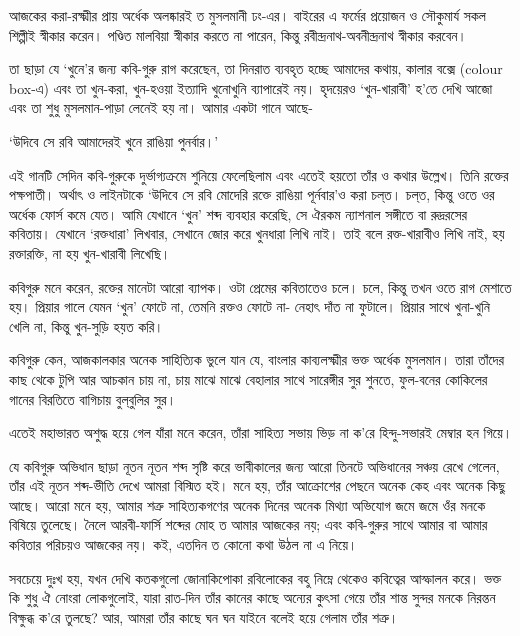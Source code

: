 \documentclass[a4paper,11pt]{article}
\begin{document}
\begin{multicols}{3}
{\begin{spacing}{1.15}
আজকের করা-রক্ষ্মীর প্রায় অর্ধেক অলষ্কারই ত মুসলমানী ঢং-এর। বাইরের এ ফর্মের প্রয়োজন ও সৌকুমার্য সকল শিল্পীই স্বীকার করেন। পণ্ডিত মালবিয়া স্বীকার করতে না পারেন, কিন্তু রবীন্দ্রনাথ-অবনীন্দ্রনাথ স্বীকার করবেন।

তা ছাড়া যে ‘খুনে’র জন্য কবি-গুরু রাগ করেছেন, তা দিনরাত ব্যবহৃত হচ্ছে আমাদের কথায়, কালার বক্সে (colour box-এ) এবং তা খুন-করা, খুন-হওয়া ইত্যাদি খুনোখুনি ব্যাপারেই নয়। হৃদয়েরও ‘খুন-খারাবী’ হ’তে দেখি আজো এবং তা শুধু মুসলমান-পাড়া লেনেই হয় না। আমার একটা গানে আছে-

‘উদিবে সে রবি আমাদেরই খুনে রাঙিয়া পুনর্বার।’

এই গানটি সেদিন কবি-গুরুকে দুর্ভাগ্যক্রমে শুনিয়ে ফেলেছিলাম এবং এতেই হয়তো তাঁর ও কথার উল্লেখ। তিনি রক্তের পক্ষপাতী। অর্থাৎ ও লাইনটাকে ‘উদিবে সে রবি মোদেরি রক্তে রাঙিয়া পূর্নবার'ও করা চল্‌ত। চল্‌ত, কিন্তু ওতে ওর অর্ধেক ফোর্স কমে যেত। আমি যেখানে ‘খুন’ শব্দ ব্যবহার করেছি, সে ঐরকম ন্যাশনাল সঙ্গীতে বা রুদ্ররসের কবিতায়। যেখানে ‘রক্তধারা’ লিখবার, সেখানে জোর করে খুনধারা লিখি নাই। তাই বলে রক্ত-খারাবীও লিখি নাই, হয় রক্তারক্তি, না হয় খুন-খারাবী লিখেছি।

কবিগুরু মনে করেন, রক্তের মানেটা আরো ব্যাপক। ওটা প্রেমের কবিতাতেও চলে। চলে, কিন্তু তখন ওতে রাগ মেশাতে হয়। প্রিয়ার গালে যেমন ‘খুন’ ফোটে না, তেমনি রক্তও ফোটে না- নেহাৎ দাঁত না ফুটালে। প্রিয়ার সাথে খুনা-খুনি খেলি না, কিন্তু খুন-সুড়ি হয়ত করি।

কবিগুরু কেন, আজকালকার অনেক সাহিত্যিক ভুলে যান যে, বাংলার কাব্যলক্ষ্মীর ভক্ত অর্ধেক মুসলমান। তারা তাঁদের কাছ থেকে টুপি আর আচকান চায় না, চায় মাঝে মাঝে বেহালার সাথে সারেঙ্গীর সুর শুনতে, ফুল-বনের কোকিলের গানের বিরতিতে বাগিচায় বুল্‌বুলির সুর।

  এতেই মহাভারত অশুদ্ধ হয়ে গেল যাঁরা মনে করেন, তাঁরা সাহিত্য সভায় ভিড় না ক’রে হিন্দু-সভারই মেম্বার হন গিয়ে।

যে কবিগুরু অভিধান ছাড়া নূতন নূতন শব্দ সৃষ্টি করে ভাবীকালের জন্য আরো তিনটে অভিধানের সঞ্চয় রেখে গেলেন, তাঁর এই নূতন শব্দ-ভীতি দেখে আমরা বিস্মিত হই। মনে হয়, তাঁর আক্রোশের পেছনে অনেক কেহ এবং অনেক কিছু আছে। আরো মনে হয়, আমার শত্রু সাহিত্যকগণের অনেক দিনের অনেক মিথ্যা অভিযোগ জমে জমে ওঁর মনকে বিষিয়ে তুলেছে। নৈলে আরবী-ফার্সি শব্দের মোহ ত আমার আজকের নয়; এবং কবি-গুরুর সাথে আমার বা আমার কবিতার পরিচয়ও আজকের নয়। কই, এতদিন ত কোনো কথা উঠল না এ নিয়ে।

সবচেয়ে দুঃখ হয়, যখন দেখি কতকগুলো জোনাকিপোকা রবিলোকের বহু নিম্নে থেকেও কবিত্বের আস্ফালন করে। ভক্ত কি শুধু ঐ নোংরা লোকগুলোই, যারা রাত-দিন তাঁর কানের কাছে অন্যের কুৎসা গেয়ে তাঁর শান্ত সুন্দর মনকে নিরন্তন বিক্ষুব্ধ ক’রে তুলছে? আর, আমরা তাঁর কাছে ঘন ঘন যাইনে বলেই হয়ে গেলাম তাঁর শত্রু।


\end{spacing}}
\end{multicols}
\end{document}
